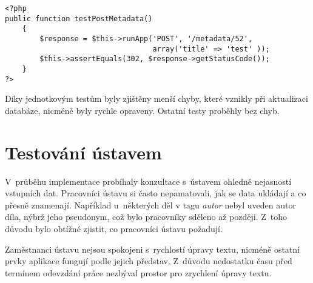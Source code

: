         \pagebreak
        
        \begin{verbatim}
<?php
public function testPostMetadata()
    {
        $response = $this->runApp('POST', '/metadata/52', 
                                  array('title' => 'test' ));
        $this->assertEquals(302, $response->getStatusCode());
    }
?>
        \end{verbatim}
        
        Díky jednotkovým testům byly zjištěny menší chyby, které vznikly při aktualizaci databáze, nicméně byly rychle opraveny. Ostatní testy proběhly bez chyb.
        
    \section{Testování ústavem}
        V~průběhu implementace probíhaly konzultace s~ústavem ohledně nejasností vstupních dat. Pracovníci ústavu si často nepamatovali, jak se data ukládají a co přesně znamenají. Například u~některých děl v tagu \textit{autor} nebyl uveden autor díla, nýbrž jeho pseudonym, což bylo pracovníky sděleno až později. Z~toho důvodu bylo obtížné zjistit, co pracovníci ústavu požadují.
        
        Zaměstnanci ústavu nejsou spokojeni s~rychlostí úpravy textu, nicméně ostatní prvky aplikace fungují podle jejich představ. Z~důvodu nedostatku času před termínem odevzdání práce nezbýval prostor pro zrychlení úpravy textu.
